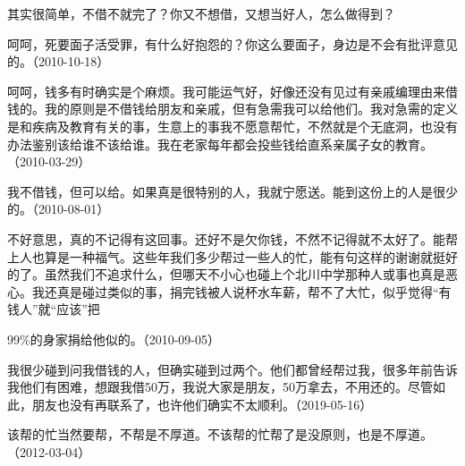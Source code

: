 其实很简单，不借不就完了？你又不想借，又想当好人，怎么做得到？


呵呵，死要面子活受罪，有什么好抱怨的？你这么要面子，身边是不会有批评意见的。（2010-10-18）


呵呵，钱多有时确实是个麻烦。我可能运气好，好像还没有见过有亲戚编理由来借钱的。我的原则是不借钱给朋友和亲戚，但有急需我可以给他们。我对急需的定义是和疾病及教育有关的事，生意上的事我不愿意帮忙，不然就是个无底洞，也没有办法鉴别该给谁不该给谁。我在老家每年都会投些钱给直系亲属子女的教育。（2010-03-29）


我不借钱，但可以给。如果真是很特别的人，我就宁愿送。能到这份上的人是很少的。（2010-08-01）


不好意思，真的不记得有这回事。还好不是欠你钱，不然不记得就不太好了。能帮上人也算是一种福气。这些年我们多少帮过一些人的忙，能有句这样的谢谢就挺好的了。虽然我们不追求什么，但哪天不小心也碰上个北川中学那种人或事也真是恶心。我还真是碰过类似的事，捐完钱被人说杯水车薪，帮不了大忙，似乎觉得“有钱人”就“应该”把

99\%的身家捐给他似的。（2010-09-05）

我很少碰到问我借钱的人，但确实碰到过两个。他们都曾经帮过我，很多年前告诉我他们有困难，想跟我借50万，我说大家是朋友，50万拿去，不用还的。尽管如此，朋友也没有再联系了，也许他们确实不太顺利。（2019-05-16）


该帮的忙当然要帮，不帮是不厚道。不该帮的忙帮了是没原则，也是不厚道。（2012-03-04）
